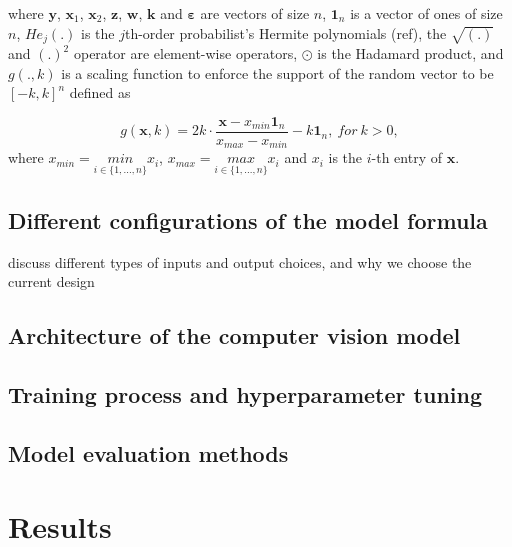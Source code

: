 \documentclass[]{interact}
\theoremstyle{plain}%
\theoremstyle{definition}
\theoremstyle{remark}
\begin{document}
\noindent where \(\boldsymbol{y}\), \(\boldsymbol{x}_1\),
\(\boldsymbol{x}_2\), \(\boldsymbol{z}\), \(\boldsymbol{w}\),
\(\boldsymbol{k}\) and \(\boldsymbol{\varepsilon}\) are vectors of size
\(n\), \(\boldsymbol{1}_n\) is a vector of ones of size \(n\),
\(He_j(.)\) is the \(j\)th-order probabilist's Hermite polynomials
(ref), the \(\sqrt{(.)}\) and \((.)^2\) operator are element-wise
operators, \(\odot\) is the Hadamard product, and \(g(., k)\) is a
scaling function to enforce the support of the random vector to be
\([-k, k]^n\) defined as

\[g(\boldsymbol{x}, k) = 2k \cdot \frac{\boldsymbol{x} - x_{min}\boldsymbol{1}_n}{x_{max} - x_{min}} - k\boldsymbol{1}_n,~for~k > 0,\]
\noindent where \(x_{min} = \underset{i \in \{ 1,...,n\}}{min} x_i\),
\(x_{max} = \underset{i \in \{ 1,...,n\}}{max} x_i\) and \(x_i\) is the
\(i\)-th entry of \(\boldsymbol{x}\).

\hypertarget{different-configurations-of-the-model-formula}{%
\subsection{Different configurations of the model
formula}\label{different-configurations-of-the-model-formula}}

discuss different types of inputs and output choices, and why we choose
the current design

\hypertarget{architecture-of-the-computer-vision-model}{%
\subsection{Architecture of the computer vision
model}\label{architecture-of-the-computer-vision-model}}

\hypertarget{training-process-and-hyperparameter-tuning}{%
\subsection{Training process and hyperparameter
tuning}\label{training-process-and-hyperparameter-tuning}}

\hypertarget{model-evaluation-methods}{%
\subsection{Model evaluation methods}\label{model-evaluation-methods}}

\hypertarget{results}{%
\section{Results}\label{results}}
\end{document}
